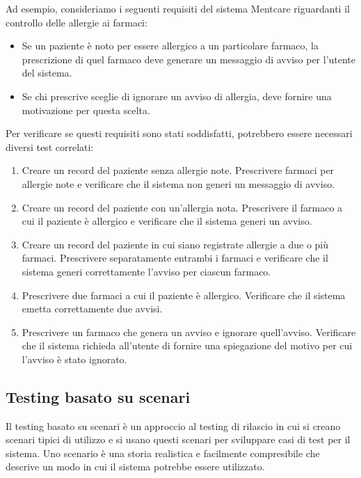 Ad esempio, consideriamo i seguenti requisiti del sistema Mentcare riguardanti il controllo delle allergie ai farmaci:
\begin{itemize}
    \item Se un paziente è noto per essere allergico a un particolare farmaco, la prescrizione di quel farmaco deve generare un messaggio di avviso per l'utente del sistema.
    \item Se chi prescrive sceglie di ignorare un avviso di allergia, deve fornire una motivazione per questa scelta.
\end{itemize}
Per verificare se questi requisiti sono stati soddisfatti, potrebbero essere necessari diversi test correlati:
\begin{enumerate}
    \item Creare un record del paziente senza allergie note. Prescrivere farmaci per allergie note e verificare che il sistema non generi un messaggio di avviso.
    \item Creare un record del paziente con un'allergia nota. Prescrivere il farmaco a cui il paziente è allergico e verificare che il sistema generi un avviso.
    \item Creare un record del paziente in cui siano registrate allergie a due o più farmaci. Prescrivere separatamente entrambi i farmaci e verificare che il sistema generi correttamente l'avviso per ciascun farmaco.
    \item Prescrivere due farmaci a cui il paziente è allergico. Verificare che il sistema emetta correttamente due avvisi.
    \item Prescrivere un farmaco che genera un avviso e ignorare quell'avviso. Verificare che il sistema richieda all'utente di fornire una spiegazione del motivo per cui l'avviso è stato ignorato.
\end{enumerate}

\subsection{Testing basato su scenari}
Il testing basato su scenari è un approccio al testing di rilascio in cui si creano scenari tipici di utilizzo e si usano questi scenari per sviluppare casi di test per il sistema. Uno scenario è una storia realistica e facilmente compresibile che descrive un modo in cui il sistema potrebbe essere utilizzato.

